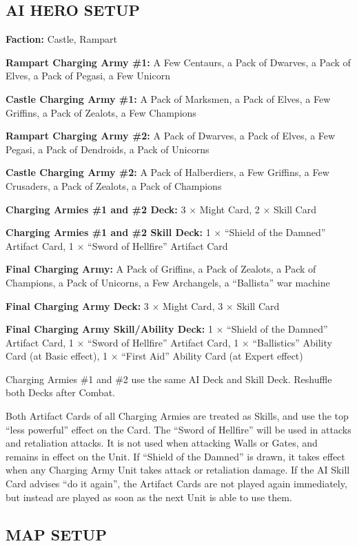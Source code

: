 \begin{multicols*}{2}
\subsection*{\MakeUppercase{AI Hero Setup}}

\textbf{Faction:} Castle, Rampart

\textbf{Rampart Charging Army \#1:} A Few Centaurs, a Pack of Dwarves, a Pack of Elves, a Pack of Pegasi, a Few Unicorn

\textbf{Castle Charging Army \#1:} A Pack of Marksmen, a Pack of Elves, a Few Griffins, a Pack of Zealots, a Few Champions

\textbf{Rampart Charging Army \#2:} A Pack of Dwarves, a Pack of Elves, a Few Pegasi, a Pack of Dendroids, a Pack of Unicorns

\textbf{Castle Charging Army \#2:} A Pack of Halberdiers, a Few Griffins, a Few Crusaders, a Pack of Zealots, a Pack of Champions

\textbf{Charging Armies \#1 and \#2 Deck:} 3 × Might Card, 2 × Skill Card

\textbf{Charging Armies \#1 and \#2 Skill Deck:} 1 × ``Shield of the Damned'' Artifact Card, 1 × ``Sword of Hellfire'' Artifact Card

\textbf{Final Charging Army:} A Pack of Griffins, a Pack of Zealots, a Pack of Champions, a Pack of Unicorns, a Few Archangels, a ``Ballista'' war machine

\textbf{Final Charging Army Deck:} 3 × Might Card, 3 × Skill Card

\textbf{Final Charging Army Skill/Ability Deck:} 1 × ``Shield of the Damned'' Artifact Card, 1 × ``Sword of Hellfire'' Artifact Card,
  1 × ``Ballistics'' Ability Card (at Basic effect), 1 × ``First Aid'' Ability Card (at Expert effect)

Charging Armies \#1 and \#2 use the same AI Deck and Skill Deck. Reshuffle both Decks after Combat.

Both Artifact Cards of all Charging Armies are treated as Skills, and use the top ``less powerful'' effect on the Card.
The ``Sword of Hellfire'' will be used in attacks and retaliation attacks.
It is not used when attacking Walls or Gates, and remains in effect on the Unit.
If ``Shield of the Damned'' is drawn, it takes effect when any Charging Army Unit takes attack or retaliation damage.
If the AI Skill Card advises ``do it again'', the Artifact Cards are not played again immediately, but instead are played as soon as the next Unit is able to use them.

\subsection*{\MakeUppercase{Map Setup}}


\end{multicols*}
